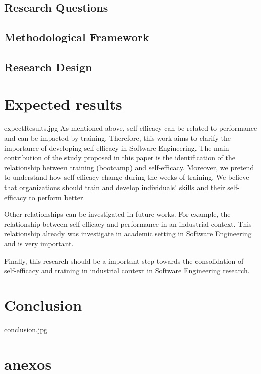 \documentclass{TheMartianReport}
\begin{document}
\subsection{Research Questions} 
\lipsum[500]

\subsection{Methodological Framework} 
\lipsum[500]

\subsection{Research Design} 
\lipsum[500]


\section{Expected results}{expectResults.jpg}
As mentioned above, self-efficacy can be related to performance and can be impacted by training. Therefore, this work aims to clarify the importance of developing self-efficacy in Software Engineering. 
The main contribution of the study proposed in this paper is the identification of the relationship between training (bootcamp) and self-efficacy. Moreover, we pretend to understand how self-efficacy change during the weeks of training.  We believe that organizations should train and develop individuals' skills and their self-efficacy to perform better. 

Other relationships can be investigated in future works. For example, the relationship between self-efficacy and performance in an industrial context.  This relationship already was investigate in academic setting \cite{davazdahemami2018training} in Software Engineering and is very important. 

Finally, this research should be a important step towards the consolidation of self-efficacy and training in industrial context in Software Engineering research.



\section{Conclusion}{conclusion.jpg}
\lipsum[500]



\section{anexos}




\end{document}

